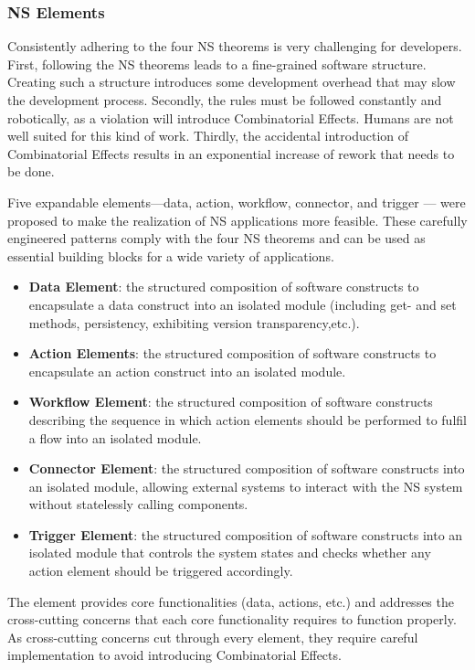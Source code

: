 \subsubsection{NS Elements}\label{NS Elements} Consistently adhering to the four NS
theorems is very challenging for developers. First, following the NS theorems leads to a
fine-grained software structure. Creating such a structure introduces some development
overhead that may slow the development process. Secondly, the rules must be followed
constantly and robotically, as a violation will introduce Combinatorial Effects. Humans
are not well suited for this kind of work. Thirdly, the accidental introduction of
Combinatorial Effects results in an exponential increase of rework that needs to be done.

Five expandable elements—data, action, workflow, connector, and trigger — were proposed to
make the realization of NS applications more feasible. These carefully engineered patterns
comply with the four NS theorems and can be used as essential building blocks for a wide
variety of applications.

\begin{itemize}
    \item \textbf{Data Element}: the structured composition of software constructs to encapsulate a data construct into an isolated module (including get- and set methods, persistency, exhibiting version transparency,etc.).
    \item \textbf{Action Elements}: the structured composition of software constructs to encapsulate an action construct into an isolated module.
    \item \textbf{Workflow Element}: the structured composition of software constructs describing the sequence in which action elements should be performed to fulfil a flow into an isolated module.
    \item \textbf{Connector Element}: the structured composition of software constructs into an isolated module, allowing external systems to interact with the NS system without statelessly calling components.
    \item \textbf{Trigger Element}: the structured composition of software constructs into an isolated module that controls the system states and checks whether any action element should be triggered accordingly.
\end{itemize}

The element provides core functionalities (data, actions, etc.) and addresses the
cross-cutting concerns that each core functionality requires to function properly. As
cross-cutting concerns cut through every element, they require careful implementation to
avoid introducing Combinatorial Effects. \\
%
%
